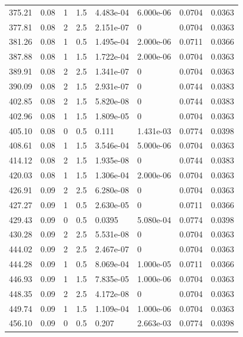 \documentclass[preview]{standalone}
\begin{document}
{{{\begin{tabular}{L{1.2cm}C{1.2cm} C{0.3cm}C{0.5cm} C{1.4cm}C{1.4cm} C{1.4cm}C{1.4cm}}
  375.21  &  0.08  & 1     & 1.5 &  4.483e-04  & 6.000e-06  & 0.0704 &  0.0363   \\ 
  377.81  &  0.08  & 2     & 2.5 &  2.151e-07  & 0  & 0.0704 &  0.0363   \\ 
  381.26  &  0.08  & 1     & 0.5 &  1.495e-04  & 2.000e-06  & 0.0711 &  0.0366   \\ 
  387.88  &  0.08  & 1     & 1.5 &  1.722e-04  & 2.000e-06  & 0.0704 &  0.0363   \\ 
  389.91  &  0.08  & 2     & 2.5 &  1.341e-07  & 0  & 0.0704 &  0.0363   \\ 
  390.09  &  0.08  & 2     & 1.5 &  2.931e-07  & 0  & 0.0744 &  0.0383   \\ 
  402.85  &  0.08  & 2     & 1.5 &  5.820e-08  & 0  & 0.0744 &  0.0383   \\ 
  402.96  &  0.08  & 1     & 1.5 &  1.809e-05  & 0  & 0.0704 &  0.0363   \\ 
  405.10  &  0.08  & 0     & 0.5 &  0.111  & 1.431e-03  & 0.0774 &  0.0398   \\ 
  408.61  &  0.08  & 1     & 1.5 &  3.546e-04  & 5.000e-06  & 0.0704 &  0.0363   \\ 
  414.12  &  0.08  & 2     & 1.5 &  1.935e-08  & 0  & 0.0744 &  0.0383   \\ 
  420.03  &  0.08  & 1     & 1.5 &  1.306e-04  & 2.000e-06  & 0.0704 &  0.0363   \\ 
  426.91  &  0.09  & 2     & 2.5 &  6.280e-08  & 0  & 0.0704 &  0.0363   \\ 
  427.27  &  0.09  & 1     & 0.5 &  2.630e-05  & 0  & 0.0711 &  0.0366   \\ 
  429.43  &  0.09  & 0     & 0.5 &  0.0395  & 5.080e-04  & 0.0774 &  0.0398   \\ 
  430.28  &  0.09  & 2     & 2.5 &  5.531e-08  & 0  & 0.0704 &  0.0363   \\ 
  444.02  &  0.09  & 2     & 2.5 &  2.467e-07  & 0  & 0.0704 &  0.0363   \\ 
  444.28  &  0.09  & 1     & 0.5 &  8.069e-04  & 1.000e-05  & 0.0711 &  0.0366   \\ 
  446.93  &  0.09  & 1     & 1.5 &  7.835e-05  & 1.000e-06  & 0.0704 &  0.0363   \\ 
  448.35  &  0.09  & 2     & 2.5 &  4.172e-08  & 0  & 0.0704 &  0.0363   \\ 
  449.74  &  0.09  & 1     & 1.5 &  1.109e-04  & 1.000e-06  & 0.0704 &  0.0363   \\ 
  456.10  &  0.09  & 0     & 0.5 &  0.207  & 2.663e-03  & 0.0774 &  0.0398   \\ 

\end{tabular}}}}
\end{document}
